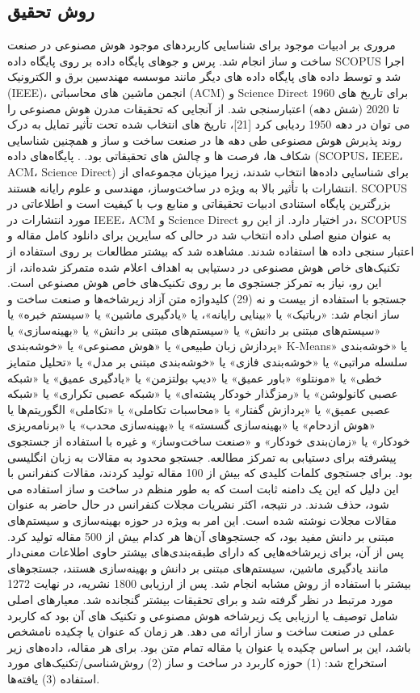 \documentclass[towcolumn, 11pt]{Article}
\begin{document}
\begin{چکیده}
\section{روش تحقیق}
مروری بر ادبیات موجود برای شناسایی کاربردهای موجود هوش مصنوعی در صنعت ساخت و ساز انجام شد. پرس و جوهای پایگاه داده بر روی پایگاه داده SCOPUS اجرا شد و توسط داده های پایگاه داده های دیگر مانند موسسه مهندسین برق و الکترونیک (IEEE)، انجمن ماشین های محاسباتی (ACM) و Science Direct برای تاریخ های 1960 تا 2020 (شش دهه) اعتبارسنجی شد. از آنجایی که تحقیقات مدرن هوش مصنوعی را می توان در دهه 1950 ردیابی کرد [21]، تاریخ های انتخاب شده تحت تأثیر تمایل به درک روند پذیرش هوش مصنوعی طی دهه ها در صنعت ساخت و ساز و همچنین شناسایی شکاف ها، فرصت ها و چالش های تحقیقاتی بود. . پایگاه‌های داده (SCOPUS، IEEE، ACM، Science Direct) برای شناسایی داده‌ها انتخاب شدند، زیرا میزبان مجموعه‌ای از انتشارات با تأثیر بالا به ویژه در ساخت‌وساز، مهندسی و علوم رایانه هستند. SCOPUS بزرگترین پایگاه استنادی ادبیات تحقیقاتی و منابع وب با کیفیت است و اطلاعاتی در مورد انتشارات در IEEE، ACM و Science Direct در اختیار دارد. از این رو، SCOPUS به عنوان منبع اصلی داده انتخاب شد در حالی که سایرین برای دانلود کامل مقاله و اعتبار سنجی داده ها استفاده شدند.
مشاهده شد که بیشتر مطالعات بر روی استفاده از تکنیک‌های خاص هوش مصنوعی در دستیابی به اهداف اعلام شده متمرکز شده‌اند، از این رو، نیاز به تمرکز جستجوی ما بر روی تکنیک‌های خاص هوش مصنوعی است. جستجو با استفاده از بیست و نه (29) کلیدواژه متن آزاد زیرشاخه‌ها و صنعت ساخت و ساز انجام شد: «رباتیک» یا «بینایی رایانه»، یا «یادگیری ماشین» یا «سیستم خبره» یا «سیستم‌های مبتنی بر دانش» یا «سیستم‌های مبتنی بر دانش» یا «بهینه‌سازی» یا «پردازش زبان طبیعی» یا «هوش مصنوعی» یا «خوشه‌بندی K-Means» یا «خوشه‌بندی سلسله مراتبی» یا «خوشه‌بندی فازی» یا «خوشه‌بندی مبتنی بر مدل» یا «تحلیل متمایز خطی» یا «مونتلو» «باور عمیق» یا «دیپ بولتزمن» یا «یادگیری عمیق» یا «شبکه عصبی کانولوشن» یا «رمزگذار خودکار پشته‌ای» یا «شبکه عصبی تکراری» یا «شبکه عصبی عمیق» یا «پردازش گفتار» یا «محاسبات تکاملی» یا «تکاملی» الگوریتم‌ها یا «هوش ازدحام» یا «بهینه‌سازی گسسته» یا «بهینه‌سازی محدب» یا «برنامه‌ریزی خودکار» یا «زمان‌بندی خودکار» و «صنعت ساخت‌وساز» و غیره با استفاده از جستجوی پیشرفته برای دستیابی به تمرکز مطالعه.
جستجو محدود به مقالات به زبان انگلیسی بود. برای جستجوی کلمات کلیدی که بیش از 100 مقاله تولید کردند، مقالات کنفرانس با این دلیل که این یک دامنه ثابت است که به طور منظم در ساخت و ساز استفاده می شود، حذف شدند. در نتیجه، اکثر نشریات مجلات کنفرانس در حال حاضر به عنوان مقالات مجلات نوشته شده است. این امر به ویژه در حوزه بهینه‌سازی و سیستم‌های مبتنی بر دانش مفید بود، که جستجوهای آن‌ها هر کدام بیش از 500 مقاله تولید کرد. پس از آن، برای زیرشاخه‌هایی که دارای طبقه‌بندی‌های بیشتر حاوی اطلاعات معنی‌دار مانند یادگیری ماشین، سیستم‌های مبتنی بر دانش و بهینه‌سازی هستند، جستجوهای بیشتر با استفاده از روش مشابه انجام شد.
پس از ارزیابی 1800 نشریه، در نهایت 1272 مورد مرتبط در نظر گرفته شد و برای تحقیقات بیشتر گنجانده شد. معیارهای اصلی شامل توصیف یا ارزیابی یک زیرشاخه هوش مصنوعی و تکنیک های آن بود که کاربرد عملی در صنعت ساخت و ساز ارائه می دهد. هر زمان که عنوان یا چکیده نامشخص باشد، این بر اساس چکیده یا عنوان یا مقاله تمام متن بود. برای هر مقاله، داده‌های زیر استخراج شد: (1) حوزه کاربرد در ساخت و ساز (2) روش‌شناسی/تکنیک‌های مورد استفاده (3) یافته‌ها.


\end{چکیده}
\end{document}
